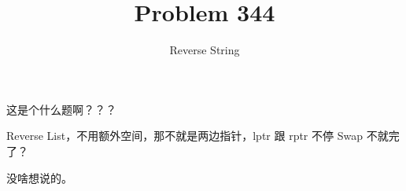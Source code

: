 \documentclass[UTF8]{ctexart}
\title{Problem 344}
\author{Reverse String}
\begin{document}
这是个什么题啊？？？

Reverse List，不用额外空间，那不就是两边指针，lptr 跟 rptr 不停 Swap 不就完了？

没啥想说的。
\end{document}
